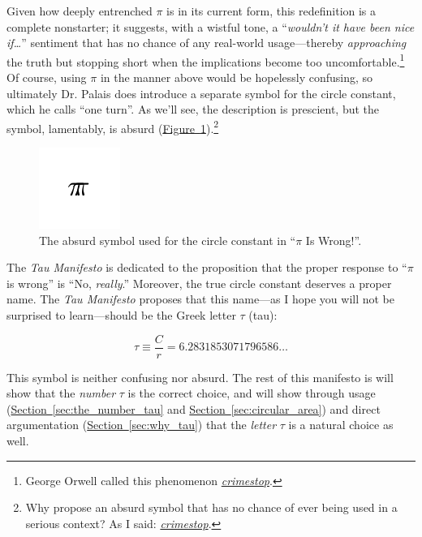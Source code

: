 \documentclass{article}
\begin{document}
\noindent Given how deeply entrenched $\pi$ is in its current form, this redefinition is a complete nonstarter; it suggests, with a wistful tone, a ``\emph{wouldn't it have been nice if\ldots}'' sentiment that has no chance of any real-world usage---thereby \emph{approaching} the truth but stopping short when the implications become too uncomfortable.\footnote{George Orwell called this phenomenon \href{http://en.wikipedia.org/wiki/Crimestop}{\emph{crimestop}}.} Of course, using $\pi$ in the manner above would be hopelessly confusing, so ultimately Dr. Palais does introduce a separate symbol for the circle constant, which he calls ``one turn''.  As we'll see, the description is prescient, but the symbol, lamentably, is absurd (\hyperref[fig:palais-tau]{Figure~}\ref{fig:palais-tau}).\footnote{Why propose an absurd symbol that has no chance of ever being used in a serious context? As I said: \href{http://en.wikipedia.org/wiki/Crimestop}{\emph{crimestop}}.}


\begin{figure}
\begin{center}
\includegraphics{images/figures/palais-tau.png}
\end{center}
\caption{The absurd symbol used for the circle constant in ``$\pi$ Is Wrong!''.\label{fig:palais-tau}}
\end{figure}

The \emph{Tau Manifesto} is dedicated to the proposition that the proper response to ``$\pi$ is wrong'' is ``No, \emph{really}.'' Moreover, the true circle constant deserves a proper name. The \emph{Tau Manifesto} proposes that this name---as I hope you will not be surprised to learn---should be the Greek letter $\tau$ (tau):

\[
  \tau \equiv \frac{C}{r} = 6.2831853071796586\ldots
\]

\noindent This symbol is neither confusing nor absurd. The rest of this manifesto is will show that the \emph{number} $\tau$ is the correct choice, and will show through usage (\hyperref[sec:the_number_tau]{Section~}\ref{sec:the_number_tau} and \hyperref[sec:circular_area]{Section~}\ref{sec:circular_area}) and direct argumentation (\hyperref[sec:why_tau]{Section~}\ref{sec:why_tau}) that the \emph{letter} $\tau$ is a natural choice as well.
\end{document}
